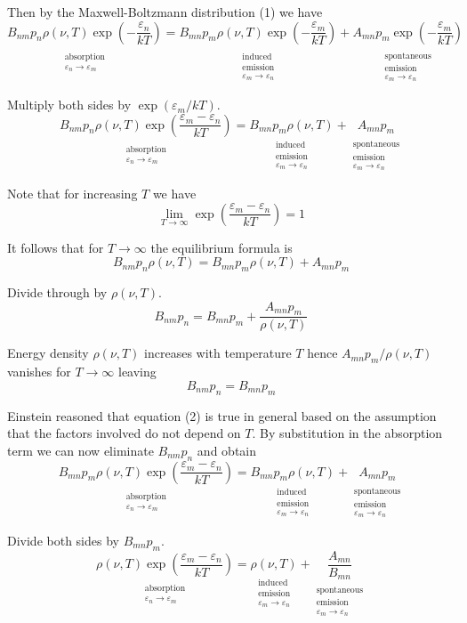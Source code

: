 \documentclass[12pt]{article}
\newcommand\BNM{B_{nm}} %
\newcommand\BMN{B_{mn}} %
\newcommand\AMN{A_{mn}} %
\newcommand\RHO{\rho(\nu,T)}
\newcommand\ABSORPTION{\substack{\\[1ex] \text{absorption}\\ \varepsilon_n\rightarrow\varepsilon_m}}
\newcommand\INDUCED{\substack{\\[1ex] \text{induced}\\ \text{emission}\\ \varepsilon_m\rightarrow\varepsilon_n}}
\newcommand\SPONTANEOUS{\substack{\\[1ex] \text{spontaneous}\\ \text{emission}\\ \varepsilon_m\rightarrow\varepsilon_n}}
\begin{document}
\noindent
Then by the Maxwell-Boltzmann distribution (1) we have
\begin{equation*}
\underset{\ABSORPTION}{\BNM p_n \RHO\exp\left(-\frac{\varepsilon_n}{kT}\right)}
=\underset{\INDUCED}{\BMN p_m \RHO\exp\left(-\frac{\varepsilon_m}{kT}\right)}
+\underset{\SPONTANEOUS}{\AMN p_m\exp\left(-\frac{\varepsilon_m}{kT}\right)}
\tag{2}
\end{equation*}

\noindent
Multiply both sides by $\exp(\varepsilon_m/kT)$.
\begin{equation*}
\underset{\ABSORPTION}{\BNM p_n \RHO\exp\left(\frac{\varepsilon_m-\varepsilon_n}{kT}\right)}
=\underset{\INDUCED}{\BMN p_m \RHO}
+\underset{\SPONTANEOUS}{\AMN p_m}
\end{equation*}

\noindent
Note that for increasing $T$ we have
\begin{equation*}
\lim_{T\rightarrow\infty}\exp\left(\frac{\varepsilon_m-\varepsilon_n}{kT}\right)=1
\end{equation*}

\noindent
It follows that for $T\rightarrow\infty$ the equilibrium formula is
\begin{equation*}
\BNM p_n \RHO
=\BMN p_m \RHO
+\AMN p_m
\end{equation*}

\noindent
Divide through by $\RHO$.
\begin{equation*}
\BNM p_n=\BMN p_m+\frac{\AMN p_m}{\RHO}
\end{equation*}

\noindent
Energy density $\RHO$ increases with temperature $T$
hence $\AMN p_m/\RHO$ vanishes for $T\rightarrow\infty$ leaving
\begin{equation*}
\BNM p_n=\BMN p_m
\tag{3}
\end{equation*}

\noindent
Einstein reasoned that equation (2) is true in general based on the assumption that
the factors involved do not depend on $T$.
By substitution in the absorption term we can now eliminate $\BNM p_n$ and obtain
\begin{equation*}
\underset{\ABSORPTION}{\BMN p_m \RHO\exp\left(\frac{\varepsilon_m-\varepsilon_n}{kT}\right)}
=\underset{\INDUCED}{\BMN p_m \RHO}
+\underset{\SPONTANEOUS}{\AMN p_m}
\end{equation*}

\noindent
Divide both sides by $\BMN p_m$.
\begin{equation*}
\underset{\ABSORPTION}{\RHO\exp\left(\frac{\varepsilon_m-\varepsilon_n}{kT}\right)}
=\underset{\INDUCED}{\RHO}+\underset{\SPONTANEOUS}{\frac{\AMN}{\BMN}}
\end{equation*}
\end{document}
